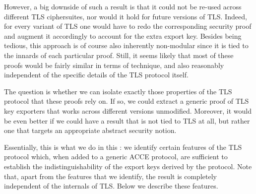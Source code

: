 However,
a big downside of such a result is that it could not be re-used across different TLS ciphersuites,
nor would it hold for future versions of TLS. 
Indeed, for every variant of TLS one would have to redo the corresponding security proof and augment it accordingly to account for the extra export key.
Besides being tedious,
this approach is of course also inherently non-modular since it is tied to the innards of each particular proof.
Still,
it seems likely that most of these proofs would be fairly similar in terms of technique,
and also reasonably independent of the specific details of the TLS protocol itself.  

The question is whether we can isolate exactly those properties of the TLS protocol that these proofs rely on.
If so, we could extract a generic proof of TLS key exporters that works across different versions unmodified.
Moreover,
it would be even better if we could have a result that is not tied to TLS at all,
but rather one that targets an appropriate abstract security notion.

Essentially,
this is what we do in this :
we identify certain features of the TLS protocol which,
when added to a generic ACCE protocol,
are sufficient to establish the indistinguishability of the export keys derived by the protocol.
Note that,
apart from the features that we identify,
the result is completely independent of the internals of TLS. 
Below we describe these features.
%

%

